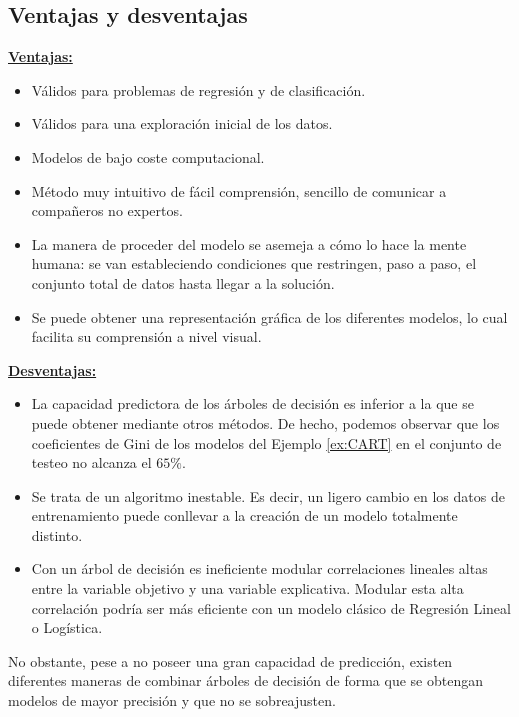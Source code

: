 \documentclass[12pt,twoside]{article}
\begin{document}
\subsection{Ventajas y desventajas}
\textbf{\underline{Ventajas:}}
\begin{itemize}
\item Válidos para problemas de regresión y de clasificación.
\item Válidos para una exploración inicial de los datos.
\item Modelos de bajo coste computacional.
\item Método muy intuitivo de fácil comprensión, sencillo de comunicar a compañeros no expertos.
\item La manera de proceder del modelo se asemeja a cómo lo hace la mente humana: se van estableciendo condiciones que restringen, paso a paso, el conjunto total de datos hasta llegar a la solución.
\item Se puede obtener una representación gráfica de los diferentes modelos, lo cual facilita su comprensión a nivel visual.
\end{itemize}

\textbf{\underline{Desventajas:}}
\begin{itemize}
\item La capacidad predictora de los árboles de decisión es inferior a la que se puede obtener mediante otros métodos. De hecho, podemos observar que los coeficientes de Gini de los modelos del Ejemplo \ref{ex:CART} en el conjunto de testeo no alcanza el $65\%$.
\item Se trata de un algoritmo inestable. Es decir, un ligero cambio en los datos de entrenamiento puede conllevar a la creación de un modelo totalmente distinto. %
\item Con un árbol de decisión es ineficiente modular correlaciones lineales altas entre la variable objetivo y una variable explicativa. Modular esta alta correlación podría ser más eficiente con un modelo clásico de Regresión Lineal o Logística.
\end{itemize}


No obstante, pese a no poseer una gran capacidad de predicción, existen diferentes maneras de combinar árboles de decisión de forma que se obtengan modelos de mayor precisión y que no se sobreajusten.




\newpage
\end{document}
